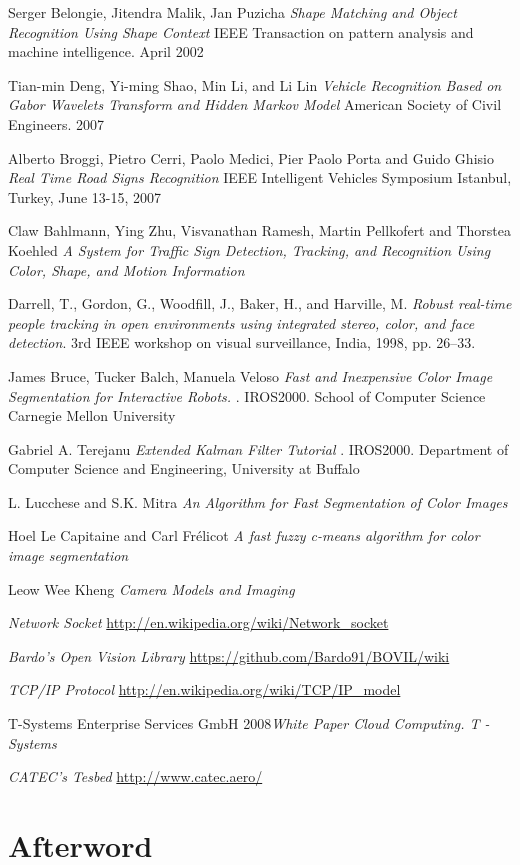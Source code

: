 \documentclass[11pt, oneside]{book} %
\begin{document}
\begin{thebibliography}{9}
 Serger Belongie, Jitendra Malik, Jan Puzicha \textit{Shape Matching and Object Recognition Using Shape Context} IEEE Transaction on pattern analysis and machine intelligence. April 2002
 
 Tian-min Deng, Yi-ming Shao, Min Li, and Li Lin \textit{Vehicle Recognition Based on Gabor Wavelets Transform and Hidden Markov Model} American Society of Civil Engineers. 2007
 
 Alberto Broggi, Pietro Cerri, Paolo Medici, Pier Paolo Porta and Guido Ghisio  \textit{Real Time Road Signs Recognition} IEEE Intelligent Vehicles Symposium Istanbul, Turkey, June 13-15, 2007

 Claw Bahlmann, Ying Zhu, Visvanathan Ramesh, Martin Pellkofert and Thorstea Koehled  \textit{A System for Traffic Sign Detection, Tracking, and 	Recognition Using Color, Shape, and Motion Information}

 Darrell, T., Gordon, G., Woodﬁll, J., Baker, H., and Harville, M. \textit{Robust real-time people tracking in open environments using integrated stereo, color, and face detection}. 3rd IEEE workshop on visual surveillance, India, 1998, pp. 26–33.

 James Bruce, Tucker Balch, Manuela Veloso  \textit{Fast and Inexpensive Color Image Segmentation for Interactive Robots.} . IROS2000. School of Computer Science Carnegie Mellon University

 Gabriel A. Terejanu \textit{Extended Kalman Filter Tutorial} . IROS2000. Department of Computer Science and Engineering, University at Buffalo

 L. Lucchese and S.K. Mitra \textit{An Algorithm for Fast Segmentation of Color Images}

 Hoel Le Capitaine and Carl Frélicot \textit{A fast fuzzy c-means algorithm for color image segmentation}

  Leow Wee Kheng \textit{Camera Models and Imaging}

 \textit{Network Socket} \url{http://en.wikipedia.org/wiki/Network_socket}

 \textit{Bardo's Open Vision Library} \url{https://github.com/Bardo91/BOVIL/wiki}

 \textit{TCP/IP Protocol}  \url{http://en.wikipedia.org/wiki/TCP/IP_model}

 T-Systems Enterprise Services GmbH 2008\textit{White Paper Cloud Computing. T - Systems} 

 \textit {CATEC's Tesbed} \url{http://www.catec.aero/}

\end{thebibliography}

\backmatter

\chapter{Afterword}
\end{document}
